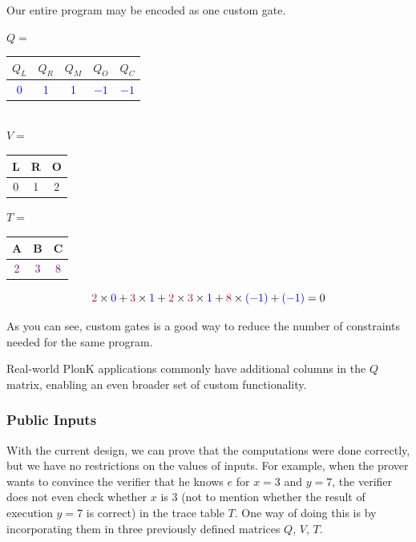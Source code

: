 \documentclass[../lecture-notes-148x210.tex]{subfiles}
\begin{document}
\begin{example}
Our entire program may be encoded as one custom gate.
\begin{center}
$Q=$ 
\begin{tabular}{|c|c|c|c|c|}
\hline
\rowcolor{gray!30}$Q_L$ & $Q_R$ & $Q_M$ & $Q_O$ & $Q_C$ \\ 
\hline
\textcolor{blue}{0} & \textcolor{blue}{1} & \textcolor{blue}{1} & \textcolor{blue}{$-1$} & \textcolor{blue}{$-1$} \\ 
\hline
\end{tabular}
\vspace{0.2cm}
\\ $V=$
\begin{tabular}{|c|c|c|}
\hline
\rowcolor{gray!30}L & R & O \\
\hline
0 & 1 & 2 \\
\hline
\end{tabular}
\quad $T=$
\begin{tabular}{|c|c|c|}
\hline
\rowcolor{gray!30}A & B & C \\
\hline
\textcolor{purple}{2} & \textcolor{purple}{3} & \textcolor{purple}{8} \\
\hline
\end{tabular}

\[\textcolor{purple}{2} \times \textcolor{blue}{0} + \textcolor{purple}{3} \times \textcolor{blue}{1} + \textcolor{purple}{2} \times \textcolor{purple}{3} \times \textcolor{blue}{1} + \textcolor{purple}{8} \times \textcolor{blue}{(-1)} + \textcolor{blue}{(-1)} = 0\]
\end{center}
As you can see, custom gates is a good way to reduce the number of constraints needed for the same program.
\end{example}

\begin{remark}
Real-world PlonK applications commonly have additional columns in the $Q$ matrix, enabling an even broader set of custom functionality.
\end{remark}

\subsubsection{Public Inputs}
With the current design, we can prove that the computations were done correctly,
but we have no restrictions on the values of inputs. For example, when the
prover wants to convince the verifier that he knows $e$ for $x=3$ and $y=7$, the
verifier does not even check whether $x$ is $3$ (not to mention whether the
result of execution $y=7$ is correct) in the trace table $T$. One way of doing
this is by incorporating them in three previously defined matrices $Q$, $V$,
$T$.
\end{document}
